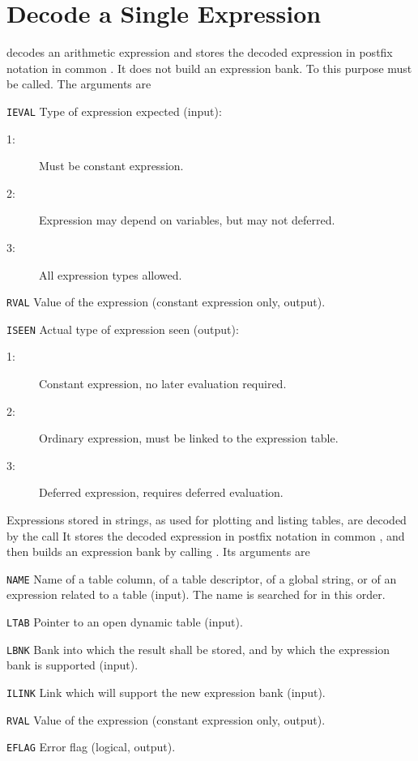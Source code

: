 \section{Decode a Single Expression}
\label{EXREAD}
decodes an arithmetic expression and stores the decoded expression in
postfix notation in common .
It does not build an expression bank.
To this purpose  must be called.
The arguments are
\begin{mylist}
\item[\tt IEVAL]
Type of expression expected (input):
\begin{description}
\item[1:] Must be constant expression.
\item[2:] Expression may depend on  variables, but may not deferred.
\item[3:] All expression types allowed.
\end{description}
\item[\tt RVAL]
Value of the expression (constant expression only, output).
\item[\tt ISEEN]
Actual type of expression seen (output):
\begin{description}
\item[1:] Constant expression, no later evaluation required.
\item[2:] Ordinary expression, must be linked to the expression table.
\item[3:] Deferred expression, requires deferred evaluation.
\end{description}
\end{mylist}
Expressions stored in strings, as used for plotting and listing tables,
are decoded by the call
\label{EXSTRG}
It stores the decoded expression in postfix notation in common
, and then builds an expression bank by calling
.
Its arguments are
\begin{mylist}
\item[\tt NAME]
Name of a table column, of a table descriptor, of a global string,
or of an expression related to a table (input).
The name is searched for in this order.    
\item[\tt LTAB]
Pointer to an open dynamic table (input).
\item[\tt LBNK]
Bank into which the result shall be stored,
and by which the expression bank is supported (input).
\item[\tt ILINK]
Link which will support the new expression bank (input).
\item[\tt RVAL]
Value of the expression (constant expression only, output).
\item[\tt EFLAG]
Error flag (logical, output).
\end{mylist}

